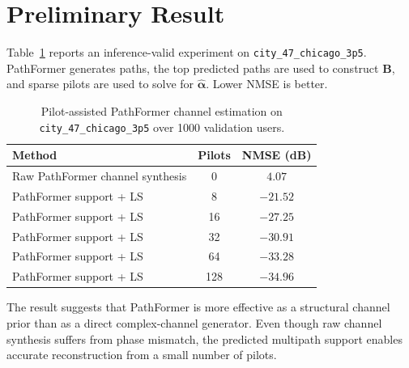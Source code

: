 \documentclass[10pt,conference]{IEEEtran}
\begin{document}
\section{Preliminary Result}

Table~\ref{tab:pilot_pathformer_result} reports an inference-valid experiment on \texttt{city\_47\_chicago\_3p5}. PathFormer generates paths, the top predicted paths are used to construct $\mathbf{B}$, and sparse pilots are used to solve for $\hat{\boldsymbol{\alpha}}$. Lower NMSE is better.

\begin{table}[t]
\centering
\caption{Pilot-assisted PathFormer channel estimation on \texttt{city\_47\_chicago\_3p5} over 1000 validation users.}
\label{tab:pilot_pathformer_result}
\begin{tabular}{lcc}
\toprule
Method & Pilots & NMSE (dB) \\
\midrule
Raw PathFormer channel synthesis & 0 & $4.07$ \\
PathFormer support + LS & 8 & $-21.52$ \\
PathFormer support + LS & 16 & $-27.25$ \\
PathFormer support + LS & 32 & $-30.91$ \\
PathFormer support + LS & 64 & $-33.28$ \\
PathFormer support + LS & 128 & $-34.96$ \\
\bottomrule
\end{tabular}
\end{table}

The result suggests that PathFormer is more effective as a structural channel prior than as a direct complex-channel generator. Even though raw channel synthesis suffers from phase mismatch, the predicted multipath support enables accurate reconstruction from a small number of pilots.
\end{document}
